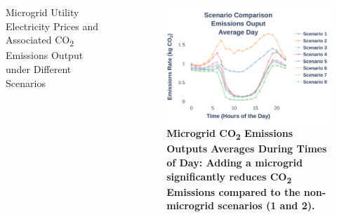 \documentclass[final, 36 pt]{beamer}
\newlength{\sepwid}
\newlength{\onecolwid}
\newlength{\twocolwid}
\begin{document}
\begin{frame}[t]
\begin{columns}[t]
\begin{column}{\twocolwid}
\begin{block}{Microgrid Utility Electricity Prices and Associated CO\textsubscript{2} Emissions Output under Different Scenarios}
	\begin{table}
		\caption{}
		\centering
		\large
		
		\label{tab:emissions}
	\end{table}
\end{block}




%	



\end{column} %

\begin{column}{\sepwid}\end{column} %

\begin{column}{\onecolwid} %
	\begin{figure}
	\centering
	\includegraphics[width=\linewidth]{Fig/emissions_scenario_comparison_run_3_large_font}
	\caption{\large \bf{Microgrid CO\textsubscript{2} Emissions Outputs Averages During Times of Day: Adding a microgrid significantly reduces CO\textsubscript{2} Emissions compared to the non-microgrid scenarios (1 and 2).}}
	\label{fig:emissionsscenariocomparison}
\end{figure}


\end{column}
\end{columns}
\end{frame}
\end{document}
